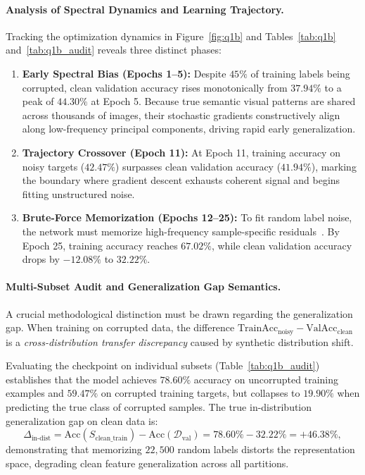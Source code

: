 \paragraph{Analysis of Spectral Dynamics and Learning Trajectory.}
Tracking the optimization dynamics in Figure~\ref{fig:q1b} and Tables~\ref{tab:q1b} and~\ref{tab:q1b_audit} reveals three distinct phases:
\begin{enumerate}
    \item \textbf{Early Spectral Bias (Epochs 1--5):} Despite $45\%$ of training labels being corrupted, clean validation accuracy rises monotonically from $37.94\%$ to a peak of $\mathbf{44.30\%}$ at Epoch 5. Because true semantic visual patterns are shared across thousands of images, their stochastic gradients constructively align along low-frequency principal components, driving rapid early generalization.
    \item \textbf{Trajectory Crossover (Epoch 11):} At Epoch 11, training accuracy on noisy targets ($42.47\%$) surpasses clean validation accuracy ($41.94\%$), marking the boundary where gradient descent exhausts coherent signal and begins fitting unstructured noise.
    \item \textbf{Brute-Force Memorization (Epochs 12--25):} To fit random label noise, the network must memorize high-frequency sample-specific residuals~\cite{arpit2017closer}. By Epoch 25, training accuracy reaches $67.02\%$, while clean validation accuracy drops by $-12.08\%$ to $32.22\%$.
\end{enumerate}

\paragraph{Multi-Subset Audit and Generalization Gap Semantics.}
A crucial methodological distinction must be drawn regarding the generalization gap. When training on corrupted data, the difference $\text{TrainAcc}_{\text{noisy}} - \text{ValAcc}_{\text{clean}}$ is a \textit{cross-distribution transfer discrepancy} caused by synthetic distribution shift. 

Evaluating the checkpoint on individual subsets (Table~\ref{tab:q1b_audit}) establishes that the model achieves $\mathbf{78.60\%}$ accuracy on uncorrupted training examples and $\mathbf{59.47\%}$ on corrupted training targets, but collapses to $\mathbf{19.90\%}$ when predicting the true class of corrupted samples. The true in-distribution generalization gap on clean data is:
\begin{equation}
    \Delta_{\text{in-dist}} = \text{Acc}(S_{\text{clean\_train}}) - \text{Acc}(\mathcal{D}_{\text{val}}) = 78.60\% - 32.22\% = +46.38\%,
\end{equation}
demonstrating that memorizing $22{,}500$ random labels distorts the representation space, degrading clean feature generalization across all partitions.
